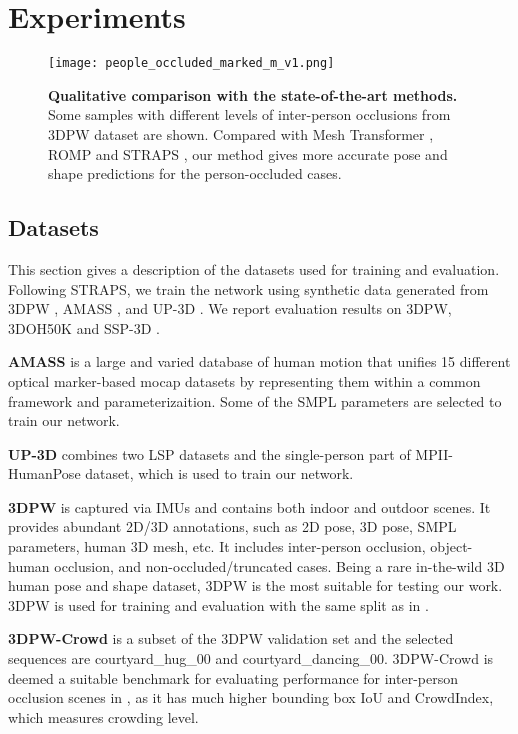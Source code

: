 \documentclass[journal]{IEEEtran}
\begin{document}
\section{Experiments}
\begin{figure*}[htbp]
    
    \centerline{\texttt{[image: people\_occluded\_marked\_m\_v1.png]}}
    \caption{\textbf{Qualitative comparison with the state-of-the-art methods.} Some samples with different levels of inter-person occlusions from 3DPW dataset are shown. Compared with Mesh Transformer \cite{lin2021end-to-end}, ROMP \cite{ROMP} and STRAPS \cite{STRAPS2020BMVC}, our method gives more accurate pose and shape predictions for the person-occluded cases.}
    \label{fig:people-occluded}
\end{figure*}
\subsection{Datasets}
This section gives a description of the datasets used for training and evaluation.
Following STRAPS\cite{STRAPS2020BMVC}, we train the network using synthetic data generated from 3DPW \cite{vonMarcard2018}, AMASS \cite{AMASS:ICCV:2019}, and UP-3D \cite{lassner2017unite}. We report evaluation results on 3DPW, 3DOH50K \cite{zhang2020object} and SSP-3D \cite{STRAPS2020BMVC}.

\textbf{AMASS} is a large and varied database of human motion that unifies 15 different optical marker-based mocap datasets by representing them within a common framework and parameterizaition. Some of the SMPL parameters are selected to train our network.

\textbf{UP-3D} combines two LSP datasets and the single-person part of MPII-HumanPose dataset, which is used to train our network.

\textbf{3DPW} is captured via IMUs and contains both indoor and outdoor scenes. It provides abundant 2D/3D annotations, such as 2D pose, 3D pose, SMPL parameters, human 3D mesh, etc. It includes inter-person occlusion, object-human occlusion, and non-occluded/truncated cases. Being a rare in-the-wild 3D human pose and shape dataset, 3DPW is the most suitable for testing our work. 3DPW is used for training and evaluation with the same split as in \cite{STRAPS2020BMVC}.

\textbf{3DPW-Crowd} is a subset of the 3DPW validation set and the selected sequences are courtyard\_hug\_00 and courtyard\_dancing\_00. 3DPW-Crowd is deemed a suitable benchmark for evaluating performance for inter-person occlusion scenes in \cite{choi20213dcrowdnet}, as it has much higher bounding box IoU and CrowdIndex\cite{li2019crowdpose}, which measures crowding level.
\end{document}
